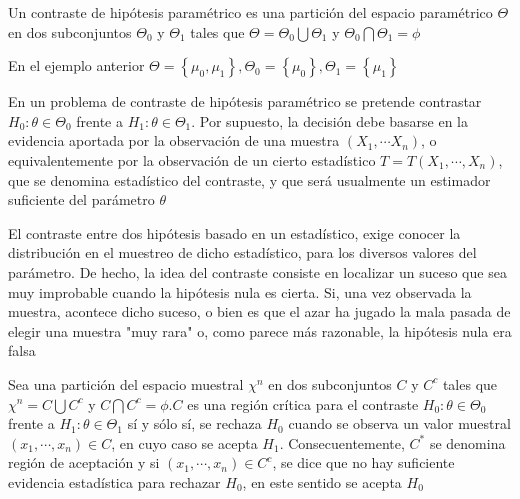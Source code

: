 \begin{definición} 
Un contraste de hipótesis paramétrico es una partición del espacio paramétrico $\Theta$ en dos subconjuntos $\Theta_{0}$ y $\Theta_{1}$ tales que $\Theta=\Theta_{0} \bigcup \Theta_{1}$ y $\Theta_{0} \bigcap \Theta_{1}=\phi$
\end{definición}

En el ejemplo anterior $\Theta=\left\{\mu_{0}, \mu_{1}\right\}, \Theta_{0}=\left\{\mu_{0}\right\}, \Theta_{1}=\left\{\mu_{1}\right\}$

En un problema de contraste de hipótesis paramétrico se pretende contrastar $H_{0}: \theta \in \Theta_{0}$ frente a $H_{1}: \theta \in \Theta_{1}$. Por supuesto, la decisión debe basarse en la evidencia aportada por la observación de una muestra $\left(X_{1}, \cdots X_{n}\right)$, o equivalentemente por la observación de un cierto estadístico $T=T\left(X_{1}, \cdots, X_{n}\right)$, que se denomina estadístico del contraste, y que será usualmente un estimador suficiente del parámetro $\theta$

El contraste entre dos hipótesis basado en un estadístico, exige conocer la distribución en el muestreo de dicho estadístico, para los diversos valores del parámetro. De hecho, la idea del contraste consiste en localizar un suceso que sea muy improbable cuando la hipótesis nula es cierta. Si, una vez observada la muestra, acontece dicho suceso, o bien es que el azar ha jugado la mala pasada de elegir una muestra "muy rara" o, como parece más razonable, la hipótesis nula era falsa

\begin{definición} 
Sea una partición del espacio muestral $\chi^{n}$ en dos subconjuntos $C$ y $C^{c}$ tales que $\chi^{n}=C \bigcup C^{c}$ y $C \bigcap C^{c}=\phi . C$ es una región crítica para el contraste $H_{0}: \theta \in \Theta_{0}$ frente a $H_{1}: \theta \in \Theta_{1}$ sí y sólo sí, se rechaza $H_{0}$ cuando se observa un valor muestral $\left(x_{1}, \cdots, x_{n}\right) \in C$, en cuyo caso se acepta $H_{1}$. Consecuentemente, $C^{*}$ se denomina región de aceptación y si $\left(x_{1}, \cdots, x_{n}\right) \in C^{c}$, se dice que no hay suficiente evidencia estadística para rechazar $H_{0}$, en este sentido se acepta $H_{0}$
\end{definición}


